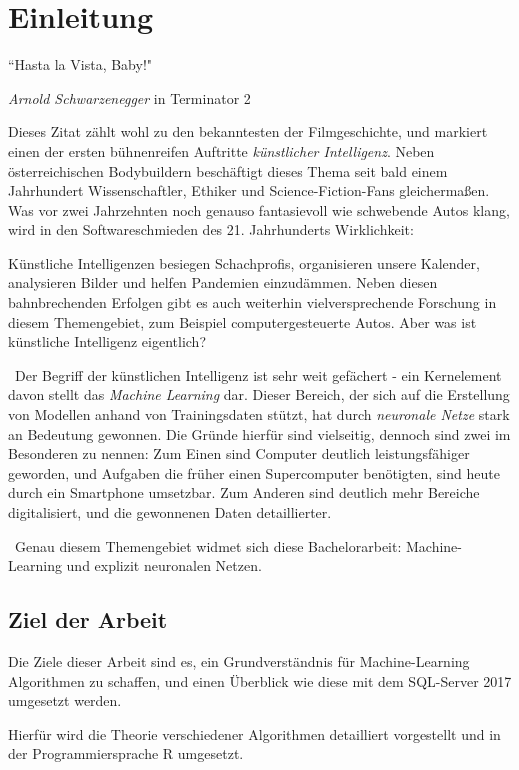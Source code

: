 \chapter{Einleitung}
\label{cha:Einleitung}
\setlength{\epigraphwidth}{4in}
\epigraph{“Hasta la Vista, Baby!"}{\textit{Arnold Schwarzenegger} \textup{ in Terminator 2}}

Dieses Zitat zählt wohl zu den bekanntesten der Filmgeschichte, und markiert einen der ersten bühnenreifen Auftritte \textit{künstlicher Intelligenz}. Neben österreichischen Bodybuildern beschäftigt dieses Thema seit bald einem Jahrhundert Wissenschaftler, Ethiker und Science-Fiction-Fans gleichermaßen. Was vor zwei Jahrzehnten noch genauso fantasievoll wie schwebende Autos klang, wird in den Softwareschmieden des 21. Jahrhunderts Wirklichkeit: 

Künstliche Intelligenzen besiegen Schachprofis, organisieren unsere Kalender, analysieren Bilder und helfen Pandemien einzudämmen. Neben diesen bahnbrechenden Erfolgen gibt es auch weiterhin vielversprechende Forschung in diesem Themengebiet, zum Beispiel computergesteuerte Autos. Aber was ist künstliche Intelligenz eigentlich?

~\newline Der Begriff der künstlichen Intelligenz ist sehr weit gefächert - ein Kernelement davon stellt das \textit{Machine Learning} dar. Dieser Bereich, der sich auf die Erstellung von Modellen anhand von Trainingsdaten stützt, hat durch \textit{neuronale Netze} stark an Bedeutung gewonnen. Die Gründe hierfür sind vielseitig, dennoch sind zwei im Besonderen zu nennen: Zum Einen sind Computer deutlich leistungsfähiger geworden, und Aufgaben die früher einen Supercomputer benötigten, sind heute durch ein Smartphone umsetzbar. Zum Anderen sind deutlich mehr Bereiche digitalisiert, und die gewonnenen Daten detaillierter. 

~\newline Genau diesem Themengebiet widmet sich diese Bachelorarbeit: Machine-Learning und explizit neuronalen Netzen. 
\section{Ziel der Arbeit}
\label{sec:ZielDerArbeit}
Die Ziele dieser Arbeit sind es, ein Grundverständnis für Machine-Learning Algorithmen zu schaffen, und einen Überblick wie diese mit dem SQL-Server 2017 umgesetzt werden. 

Hierfür wird die Theorie verschiedener Algorithmen detailliert vorgestellt und in der Programmiersprache R umgesetzt. 

